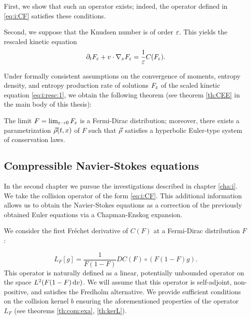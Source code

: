 First, we show that such an operator exists; indeed, the operator defined in \eqref{eq:i:CF} satisfies these conditions.


Second, we suppose that the Knudsen number is of order ${\varepsilon}$.  This yields the rescaled kinetic equation
\begin{equation}\label{eq:i:resc:1}
	\partial_t F_{\varepsilon}+ v\cdot \nabla_x F_{\varepsilon}=\frac{1}{{\varepsilon}}C(F_{\varepsilon}).
\end{equation}

Under formally consistent assumptions on the convergence of moments, entropy density, and entropy production rate of solutions $F_{\varepsilon} $ of the scaled kinetic equation \eqref{eq:i:resc:1}, we obtain the following theorem (see theorem \ref{th:CEE} in the main body of this thesis):

\begin{theorem*}
	The limit $F=\lim_{{\varepsilon}\to 0}F_{\varepsilon}$ is a Fermi-Dirac distribution; moreover, there exists a parametrization ${\vec\rho}(t,x)$ of $F$ such that ${\vec\rho}$ satisfies a hyperbolic Euler-type system of conservation laws.
\end{theorem*}

\subsection{Compressible Navier-Stokes equations} %
\label{sub:compressible_navier_stokes_equations}

In the second chapter we pursue the investigations described in chapter \ref{cha:i}. We take the collision operator of the form \eqref{eq:i:CF}. This additional information allows us to obtain the Navier-Stokes equations as a correction of the previously obtained Euler equations via a Chapman-Enskog expansion.


We consider the first Fréchet derivative of $C(F)$ at a Fermi-Dirac distribution $F$:

\[L_F[g]=\frac{1}{F(1-F)}DC(F)\circ (F(1-F)g).\]
This operator is naturally defined as a linear, potentially unbounded operator on the space $L^2(F(1-F){\,\mathrm{d} v})$. We will assume that this operator is self-adjoint, non-positive, and satisfies the Fredholm alternative. We provide sufficient conditions on the collision kernel $b$ ensuring the aforementioned properties of the operator $L_F$ (see theorems \ref{th:com:exa}, \ref{th:kerL}).

